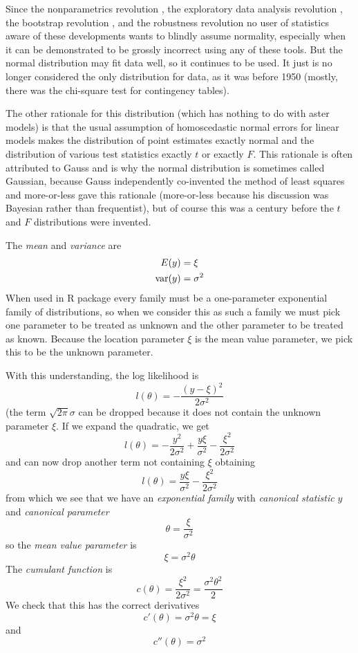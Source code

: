 Since the nonparametrics revolution \citep{hollander-wolfe-chicken},
the exploratory data analysis revolution \citep{tukey},
the bootstrap revolution \citep{efron-tibshirani,davison-hinkley},
and the robustness revolution \citep{huber-ronchetti,hampel-et-al}
no user of statistics aware of these developments wants to blindly
assume normality, especially when it can be demonstrated to be grossly
incorrect using any of these tools.  But the normal distribution may
fit data well, so it continues to be used.  It just is no longer considered
the only distribution for data, as it was before 1950 (mostly, there was
the chi-square test for contingency tables).

The other rationale for this distribution (which has nothing to do with
aster models) is that the usual assumption of homoscedastic normal errors
for linear models makes the distribution of point estimates exactly normal
and the distribution of various test statistics exactly $t$ or exactly $F$.
This rationale is often attributed to Gauss and is why the normal distribution
is sometimes called Gaussian, because Gauss independently co-invented the
method of least squares and more-or-less gave this rationale (more-or-less
because his discussion was Bayesian rather than frequentist), but of course
this was a century before the $t$ and $F$ distributions were invented.

The \emph{mean} and \emph{variance} are
\begin{align*}
   E(y) & = \xi
   \\
   \operatorname{var}(y) & = \sigma^2
\end{align*}
When used in R package  every family must be a one-parameter
exponential family of distributions, so when we consider this as such a family
we must pick one parameter to be treated as unknown
and the other parameter to be treated as known.
Because the location parameter $\xi$ is the mean value parameter,
we pick this to be the unknown parameter.

With this understanding, the log likelihood is
$$
   l(\theta) = - \frac{(y - \xi)^2}{2 \sigma^2}
$$
(the term $\sqrt{2 \pi} \sigma$ can be dropped because it does not contain the
unknown parameter $\xi$.  If we expand the quadratic, we get
$$
   l(\theta)
   =
   - \frac{y^2}{2 \sigma^2}
   + \frac{y \xi}{\sigma^2}
   - \frac{\xi^2}{2 \sigma^2}
$$
and can now drop another term not containing $\xi$ obtaining
$$
   l(\theta)
   =
   \frac{y \xi}{\sigma^2} - \frac{\xi^2}{2 \sigma^2}
$$
from which we see that we have an \emph{exponential family} with
\emph{canonical statistic} $y$ and \emph{canonical parameter}
$$
   \theta = \frac{\xi}{\sigma^2}
$$
so the \emph{mean value parameter} is
$$
   \xi = \sigma^2 \theta
$$
The \emph{cumulant function} is
$$
   c(\theta) = \frac{\xi^2}{2 \sigma^2}
   = \frac{\sigma^2 \theta^2}{2}
$$
We check that this has the correct derivatives
$$
   c'(\theta) = \sigma^2 \theta = \xi
$$
and
$$
   c''(\theta) = \sigma^2
$$

